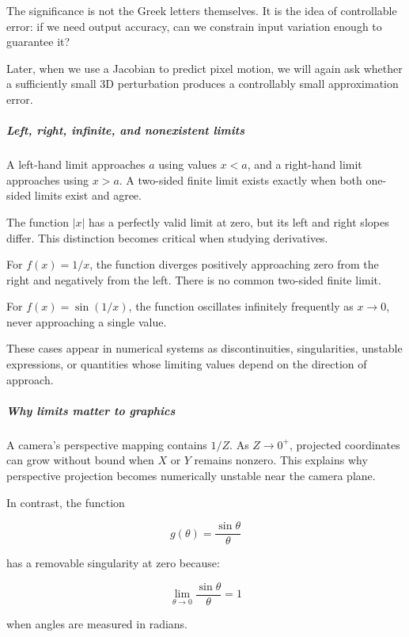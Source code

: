 The significance is not the Greek letters themselves. It is the idea of controllable error: if we need output accuracy, can we constrain input variation enough to guarantee it?

Later, when we use a Jacobian to predict pixel motion, we will again ask whether a sufficiently small 3D perturbation produces a controllably small approximation error.

\subparagraph{Left, right, infinite, and nonexistent limits}\label{01-foundations-i-ch020-left-right-infinite-and-nonexistent-limits}

\hypertarget{01-foundations-i-ch020-left-right-infinite-and-nonexistent-limits}{}

A left-hand limit approaches \(a\) using values \(x<a\), and a right-hand limit approaches using \(x>a\). A two-sided finite limit exists exactly when both one-sided limits exist and agree.

The function \(|x|\) has a perfectly valid limit at zero, but its left and right slopes differ. This distinction becomes critical when studying derivatives.

For \(f(x)=1/x\), the function diverges positively approaching zero from the right and negatively from the left. There is no common two-sided finite limit.

For \(f(x)=\sin(1/x)\), the function oscillates infinitely frequently as \(x\to0\), never approaching a single value.

These cases appear in numerical systems as discontinuities, singularities, unstable expressions, or quantities whose limiting values depend on the direction of approach.

\subparagraph{Why limits matter to graphics}\label{01-foundations-i-ch020-why-limits-matter-to-graphics}

\hypertarget{01-foundations-i-ch020-why-limits-matter-to-graphics}{}

A camera's perspective mapping contains \(1/Z\). As \(Z\to0^+\), projected coordinates can grow without bound when \(X\) or \(Y\) remains nonzero. This explains why perspective projection becomes numerically unstable near the camera plane.

In contrast, the function

\[
g(\theta)=\frac{\sin\theta}{\theta}
\]

has a removable singularity at zero because:

\[
\lim_{\theta\to0}\frac{\sin\theta}{\theta}=1
\]

when angles are measured in radians.

